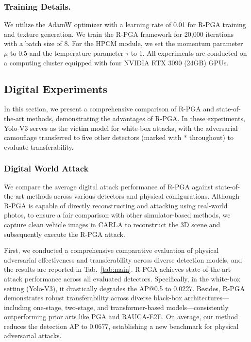 \documentclass[10pt,journal,compsoc]{IEEEtran}
\begin{document}
\subsubsection{Training Details.}
We utilize the AdamW optimizer with a learning rate of 0.01 for R-PGA training and texture generation. 
We train the R-PGA framework for 20,000 iterations with a batch size of 8. For the HPCM module, we set the momentum parameter $\mu$ to 0.5 and the temperature parameter $\tau$ to 1. All experiments are conducted on a computing cluster equipped with four NVIDIA RTX 3090 (24GB) GPUs.

\subsection{Digital Experiments}
In this section, we present a comprehensive comparison of R-PGA and state-of-the-art methods, demonstrating the advantages of R-PGA. 
In these experiments, Yolo-V3 serves as the victim model for white-box attacks, with the adversarial camouflage transferred to five other detectors (marked with * throughout) to evaluate transferability.
\subsubsection{Digital World Attack}
We compare the average digital attack performance of R-PGA against state-of-the-art methods across various detectors and physical configurations.
Although R-PGA is capable of directly reconstructing and attacking using real-world photos, to ensure a fair comparison with other simulator-based methods, we capture clean vehicle images in CARLA to reconstruct the 3D scene and subsequently execute the R-PGA attack. 

First, we conducted a comprehensive comparative evaluation of physical adversarial effectiveness and transferability across diverse detection models, and the results are reported in Tab.~\ref{tab:main}.
R-PGA achieves state-of-the-art attack performance across all evaluated detectors.
Specifically, in the white-box setting (Yolo-V3), it drastically degrades the AP@0.5 to 0.0227.
Besides, R-PGA demonstrates robust transferability across diverse black-box architectures—including one-stage, two-stage, and transformer-based models—consistently outperforming prior arts like PGA and RAUCA-E2E. On average, our method reduces the detection AP to 0.0677, establishing a new benchmark for physical adversarial attacks.
\end{document}
